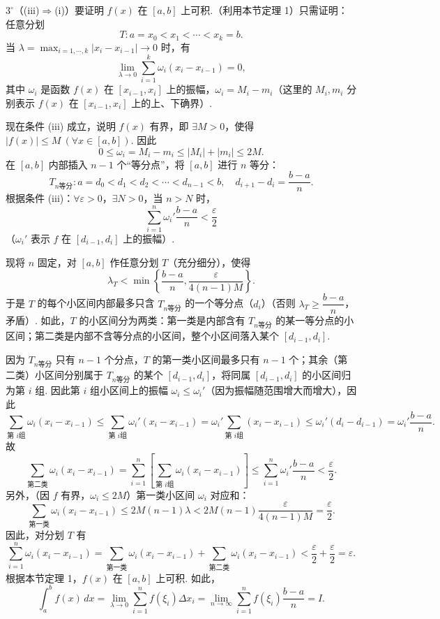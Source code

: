 \documentclass[UTF8, 12pt, fontset=fandol, oneside]{ctexart}
\begin{document}
$3^\circ$（(iii)$\Rightarrow$(i)）要证明 $f(x)$ 在 $[a,b]$ 上可积.（利用本节定理 1）只需证明：任意分划
\[
T:a=x_0<x_1<\cdots<x_k=b.
\tag{1}
\]
当 $\lambda=\max_{i=1,\cdots,k}|x_i-x_{i-1}|\to0$ 时，有
\[
\lim_{\lambda\to0}\sum_{i=1}^k\omega_i(x_i-x_{i-1})=0,
\]
其中 $\omega_i$ 是函数 $f(x)$ 在 $[x_{i-1},x_i]$ 上的振幅，$\omega_i=M_i-m_i$（这里的 $M_i,m_i$ 分别表示 $f(x)$ 在 $[x_{i-1},x_i]$ 上的上、下确界）.

现在条件 (iii) 成立，说明 $f(x)$ 有界，即 $\exists M>0$，使得 $|f(x)|\le M\ (\forall x\in[a,b])$. 因此
\[
0\le\omega_i=M_i-m_i\le |M_i|+|m_i|\le2M.
\tag{2}
\]
在 $[a,b]$ 内部插入 $n-1$ 个“等分点”，将 $[a,b]$ 进行 $n$ 等分：
\[
T_{n\text{等分}}:a=d_0<d_1<d_2<\cdots<d_{n-1}<b,\quad d_{i+1}-d_i=\frac{b-a}{n}.
\]
根据条件 (iii)：$\forall\varepsilon>0$，$\exists N>0$，当 $n>N$ 时，
\[
\sum_{i=1}^n\omega_i'\frac{b-a}{n}<\frac{\varepsilon}{2}
\]
（$\omega_i'$ 表示 $f$ 在 $[d_{i-1},d_i]$ 上的振幅）.

现将 $n$ 固定，对 $[a,b]$ 作任意分划 $T$（充分细分），使得
\[
\lambda_T<\min\left\{\frac{b-a}{n},\frac{\varepsilon}{4(n-1)M}\right\}.
\]
于是 $T$ 的每个小区间内部最多只含 $T_{n\text{等分}}$ 的一个等分点（$d_i$）（否则 $\lambda_T\ge\dfrac{b-a}{n}$，矛盾）. 如此，$T$ 的小区间分为两类：第一类是内部含有 $T_{n\text{等分}}$ 的某一等分点的小区间；第二类是内部不含等分点的小区间，整个小区间落入某个 $[d_{i-1},d_i]$.

因为 $T_{n\text{等分}}$ 只有 $n-1$ 个分点，$T$ 的第一类小区间最多只有 $n-1$ 个；其余（第二类）小区间分别属于 $T_{n\text{等分}}$ 的某个 $[d_{i-1},d_i]$，将同属 $[d_{i-1},d_i]$ 的小区间归为第 $i$ 组. 因此第 $i$ 组小区间上的振幅 $\omega_i\le\omega_i'$（因为振幅随范围增大而增大），因此
\[
\sum_{\text{第 }i\text{组}}\omega_i(x_i-x_{i-1})
\le\sum_{\text{第 }i\text{组}}\omega_i'(x_i-x_{i-1})
=\omega_i'\sum_{\text{第 }i\text{组}}(x_i-x_{i-1})
\le\omega_i'(d_i-d_{i-1})=\omega_i'\frac{b-a}{n}.
\]
故
\[
\sum_{\text{第二类}}\omega_i(x_i-x_{i-1})
=\sum_{i=1}^n\left[\sum_{\text{第 }i\text{组}}\omega_i(x_i-x_{i-1})\right]
\le\sum_{i=1}^n\omega_i'\frac{b-a}{n}<\frac{\varepsilon}{2}.
\]
另外，（因 $f$ 有界，$\omega_i\le2M$）第一类小区间 $\omega_i$ 对应和：
\[
\sum_{\text{第一类}}\omega_i(x_i-x_{i-1})
\le2M(n-1)\lambda<2M(n-1)\frac{\varepsilon}{4(n-1)M}=\frac{\varepsilon}{2}.
\]
因此，对分划 $T$ 有
\[
\sum_{i=1}^n\omega_i(x_i-x_{i-1})
=\sum_{\text{第一类}}\omega_i(x_i-x_{i-1})
+\sum_{\text{第二类}}\omega_i(x_i-x_{i-1})
<\frac{\varepsilon}{2}+\frac{\varepsilon}{2}=\varepsilon.
\]
根据本节定理 1，$f(x)$ 在 $[a,b]$ 上可积. 如此，
\[
\int_a^b f(x)\,dx=\lim_{\lambda\to0}\sum_{i=1}^n f(\xi_i)\Delta x_i
=\lim_{n\to\infty}\sum_{i=1}^n f(\xi_i)\frac{b-a}{n}=I.
\]
\end{document}
